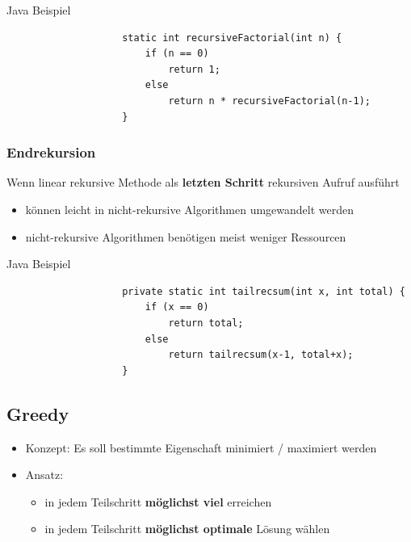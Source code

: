 \documentclass[a4paper, landscape, 8pt]{scrartcl}
\begin{document}
\begin{multicols*}{4}
                    \textcolor{subsectioncolor}{Java Beispiel}
                    \begin{lstlisting}
                    static int recursiveFactorial(int n) {
                        if (n == 0)
                            return 1;
                        else
                            return n * recursiveFactorial(n-1);
                    }
                    \end{lstlisting}

                \subsubsection{Endrekursion}
                    Wenn linear rekursive Methode als {\bfseries letzten Schritt} rekursiven Aufruf ausführt
                    \begin{itemize}
                        \item können leicht in nicht-rekursive Algorithmen umgewandelt werden
                        \item nicht-rekursive Algorithmen benötigen meist weniger Ressourcen
                    \end{itemize}
                    \textcolor{subsectioncolor}{Java Beispiel}
                    \begin{lstlisting}
                    private static int tailrecsum(int x, int total) {
                        if (x == 0)
                            return total;
                        else
                            return tailrecsum(x-1, total+x);
                    }
                    \end{lstlisting}

            \subsection{Greedy}
                \begin{itemize}
                    \item Konzept: Es soll bestimmte Eigenschaft minimiert / maximiert werden
                    \item Ansatz:
                    \begin{itemize}
                        \item in jedem Teilschritt {\bfseries möglichst viel} erreichen
                        \item in jedem Teilschritt {\bfseries möglichst optimale} Lösung wählen
                    \end{itemize}
                \end{itemize}

\end{multicols*}
\end{document}

